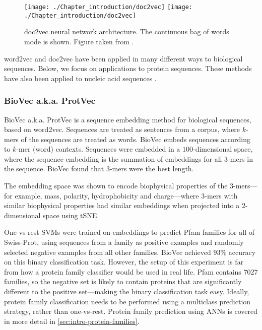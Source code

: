 \begin{figure}[!hbt]
    \centering
    \ifredact
        \texttt{[image: ./Chapter\_introduction/doc2vec]}
    \else
        \texttt{[image: ./Chapter\_introduction/doc2vec]}
    \fi
    \caption{%
        doc2vec neural network architecture.
        The continuous bag of words mode is shown.
        Figure taken from \cite{Le2014}.
    }
    \label{fig:doc2vec}
\end{figure}

word2vec and doc2vec have been applied in many different ways to biological sequences. Below, we focus on applications to protein sequences. These methods have also been applied to nucleic acid sequences \cite{Asgari2015,Ng2017}.

\subsubsection{BioVec a.k.a. ProtVec}

BioVec a.k.a. ProtVec \cite{Asgari2015} is a sequence embedding method for biological sequences, based on word2vec. Sequences are treated as sentences from a corpus, where $k$-mers of the sequences are treated as words. BioVec embeds sequences according to $k$-mer (word) contexts. Sequences were embedded in a $100$-dimensional space, where the sequence embedding is the summation of embeddings for all $3$-mers in the sequence. BioVec found that $3$-mers were the best length.

The embedding space was shown to encode biophysical properties of the $3$-mers---for example, mass, polarity, hydrophobicity and charge---where $3$-mers with similar biophysical properties had similar embeddings when projected into a $2$-dimensional space using tSNE.

One-vs-rest SVMs were trained on embeddings to predict Pfam families for all of Swiss-Prot, using sequences from a family as positive examples and randomly selected negative examples from all other families. BioVec achieved $93\%$ accuracy on this binary classification task. However, the setup of this experiment is far from how a protein family classifier would be used in real life. Pfam contains \num{7027} families, so the negative set is likely to contain proteins that are significantly different to the positive set---making the binary classification task easy. Ideally, protein family classification needs to be performed using a multiclass prediction strategy, rather than one-vs-rest. Protein family prediction using ANNs is covered in more detail in \ref{sec:intro-protein-families}.

